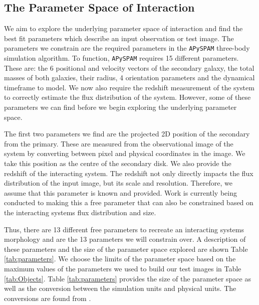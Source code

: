 \subsection{The Parameter Space of Interaction}
We aim to explore the underlying parameter space of interaction and find the best fit parameters which describe an input observation or test image. The parameters we constrain are the required parameters in the \texttt{APySPAM} three-body simulation algorithm. To function, \texttt{APySPAM} requires 15 different parameters. These are: the 6 positional and velocity vectors of the secondary galaxy, the total masses of both galaxies, their radius, 4 orientation parameters and the dynamical timeframe to model. We now also require the redshift measurement of the system to correctly estimate the flux distribution of the system. However, some of these parameters we can find before we begin exploring the underlying parameter space.

The first two parameters we find are the projected 2D position of the secondary from the primary. These are measured from the observational image of the system by converting between pixel and physical coordinates in the image. We take this position as the centre of the secondary disk. We also provide the redshift of the interacting system. The redshift not only directly impacts the flux distribution of the input image, but its scale and resolution. Therefore, we assume that this parameter is known and provided. Work is currently being conducted to making this a free parameter that can also be constrained based on the interacting systems flux distribution and size.

Thus, there are 13 different free parameters to recreate an interacting systems morphology and are the 13 parameters we will constrain over. A description of these parameters and the size of the parameter space explored are shown Table \ref{tab:parameters}. We choose the limits of the parameter space based on the maximum values of the parameters we used to build our test images in Table \ref{tab:Objects}. Table \ref{tab:parameters} provides the size of the parameter space as well as the conversion between the simulation units and physical units. The conversions are found from \citet{1990AJ....100.1477W}.

